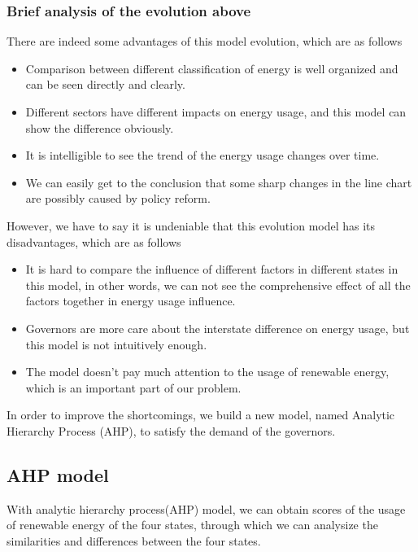 \documentclass[a4paper,11pt]{article}
\begin{document}
\subsubsection{Brief analysis of the evolution above}
\par There are indeed some advantages of this model evolution, which are as follows
\begin{itemize}
    \item Comparison between different classification of energy is well organized and can be seen directly and clearly.
    \item Different sectors have different impacts on energy usage, and this model can show the difference obviously.
    \item It is intelligible to see the trend of the energy usage changes over time.
    \item We can easily get to the conclusion that some sharp changes in the line chart are possibly caused by policy reform.  
\end{itemize}
\par However, we have to say it is undeniable that this evolution model has its disadvantages, which are as follows
\begin{itemize}
    \item It is hard to compare the influence of different factors in different states in this model, in other words, we can not see the comprehensive effect of all the factors together in energy usage influence.
    \item Governors are more care about the interstate difference on energy usage, but this model is not intuitively enough.
    \item The model doesn't pay much attention to the usage of renewable energy, which is an important part of our problem.
\end{itemize}
\par In order to improve the shortcomings, we build a new model, named Analytic Hierarchy Process (AHP), to satisfy the demand of the governors.


\subsection{AHP model}
\par With analytic hierarchy process(AHP) model, we can obtain scores of the usage of renewable energy of the four states, through which we can analysize the similarities and differences between the four states. 
\end{document}

